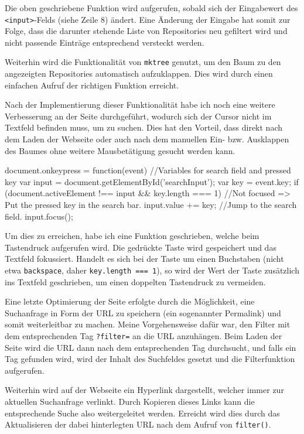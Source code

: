\documentclass[xcolor=dvipsnames,11pt,paper=a4paper]{report}
\begin{document}
Die oben geschriebene Funktion wird aufgerufen, sobald sich der Eingabewert des
\texttt{<input>}-Felds (siehe Zeile 8) ändert. Eine Änderung der Eingabe hat somit
zur Folge, dass die darunter stehende Liste von Repositories neu gefiltert wird
und nicht passende Einträge entsprechend versteckt werden.

Weiterhin wird die Funktionalität von \texttt{mktree} genutzt, um den Baum zu den
angezeigten Repositories automatisch aufzuklappen. Dies wird durch einen einfachen
Aufruf der richtigen Funktion erreicht.

Nach der Implementierung dieser Funktionalität habe ich noch eine weitere Verbesserung
an der Seite durchgeführt, wodurch sich der Cursor nicht im Textfeld befinden muss,
um zu suchen. Dies hat den Vorteil, dass direkt nach dem Laden der Webseite oder
auch nach dem manuellen Ein- bzw. Ausklappen des Baumes ohne weitere Mausbetätigung
gesucht werden kann.

\begin{code}[language=javascript, caption={Funktion für Suche auf Tastendruck}]
document.onkeypress = function(event) {
	//Variables for search field and pressed key
	var input = document.getElementById('searchInput');
	var key = event.key;
	if (document.activeElement !== input && key.length === 1) {
		//Not focused => Put the pressed key in the search bar.
		input.value += key;
	}
	//Jump to the search field.
	input.focus();
}
\end{code}

Um dies zu erreichen, habe ich eine Funktion geschrieben, welche beim Tastendruck
aufgerufen wird. Die gedrückte Taste wird gespeichert und das Textfeld fokussiert.
Handelt es sich bei der Taste um einen Buchstaben (nicht etwa \texttt{backspace},
daher \texttt{key.length === 1}), so wird der Wert der Taste zusätzlich ins Textfeld
geschrieben, um einen doppelten Tastendruck zu vermeiden.

Eine letzte Optimierung der Seite erfolgte durch die Möglichkeit, eine Suchanfrage
in Form der URL zu speichern (ein sogenannter Permalink) und somit weiterleitbar
zu machen. Meine Vorgehensweise dafür war, den Filter mit dem entsprechenden Tag
\texttt{?filter=} an die URL anzuhängen. Beim Laden der Seite wird die URL dann
nach dem entsprechenden Tag durchsucht, und falls ein Tag gefunden wird, wird der
Inhalt des Suchfeldes gesetzt und die Filterfunktion aufgerufen.

Weiterhin wird auf der Webseite ein Hyperlink dargestellt, welcher immer zur aktuellen
Suchanfrage verlinkt. Durch Kopieren dieses Links kann die entsprechende Suche also
weitergeleitet werden. Erreicht wird dies durch das Aktualisieren der dabei hinterlegten
URL nach dem Aufruf von \texttt{filter()}.
\end{document}
